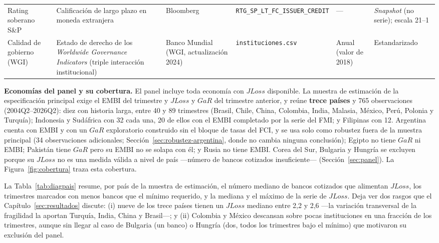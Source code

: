 \begin{footnotesize}
\begin{longtable}{%
  >{\Lc}p{2.15cm}%
  >{\Lc}p{2.7cm}%
  >{\Lc}p{1.8cm}%
  >{\Lc}p{2.85cm}%
  >{\Lc}p{1.75cm}%
  >{\Lc}p{2.5cm}}
Rating soberano S\&P & Calificación de largo plazo en moneda extranjera & Bloomberg & \texttt{RTG\_\allowbreak SP\_\allowbreak LT\_\allowbreak FC\_\allowbreak ISSUER\_\allowbreak CREDIT} & --- & \textit{Snapshot} (no serie); escala 21--1 \\
Calidad de gobierno (WGI) & Estado de derecho de los \textit{Worldwide Governance Indicators} (triple interacción institucional) & Banco Mundial (WGI, actualización 2024) & \texttt{instituciones.\allowbreak csv} & Anual (valor de 2018) & Estandarizado \\

\end{longtable}
\end{footnotesize}

\vspace{1em}

\noindent \textbf{Economías del panel y su cobertura.} El panel incluye toda economía
con $JLoss$ disponible. La muestra de estimación de la especificación principal exige el EMBI
del trimestre y $JLoss$ y $GaR$ del trimestre anterior, y reúne \textbf{trece países} y 765
observaciones (2004Q2--2026Q2): diez con historia larga, entre 40 y 89 trimestres (Brasil,
Chile, China, Colombia, India, Malasia, México, Perú, Polonia y Turquía); Indonesia y
Sudáfrica con 32 cada una, 20 de ellos con el EMBI completado por la serie del FMI; y Filipinas
con 12. Argentina cuenta con EMBI y con un $GaR$ exploratorio construido sin el bloque de tasas
del FCI, y se usa solo como robustez fuera de la muestra principal (34 observaciones
adicionales; Sección~\ref{sec:robustez-argentina}, donde no cambia ninguna conclusión); Egipto no tiene $GaR$ ni
EMBI; Pakistán tiene $GaR$ pero su EMBI no se solapa con él; y Rusia no tiene EMBI. Corea del
Sur, Bulgaria y Hungría se excluyen porque su $JLoss$ no es una medida válida a nivel de país
---número de bancos cotizados insuficiente--- (Sección~\ref{sec:panel}). La Figura~\ref{fig:cobertura} traza esta cobertura.

\vspace{1ex}

\noindent La Tabla~\ref{tab:diagpais} resume, por país de la muestra de estimación, el número
mediano de bancos cotizados que alimentan $JLoss$, los trimestres marcados con menos bancos
que el mínimo requerido, y la mediana y el máximo de la serie de $JLoss$. Deja ver dos rasgos
que el Capítulo~\ref{sec:resultados} discute: (i) nueve de los trece países tienen un $JLoss$
mediano entre 2,2 y 2,6 —la variación transversal de la fragilidad la aportan Turquía, India,
China y Brasil—; y (ii) Colombia y México descansan sobre pocas instituciones en una fracción
de los trimestres, aunque sin llegar al caso de Bulgaria (un banco) o Hungría (dos, todos los
trimestres bajo el mínimo) que motivaron su exclusión del panel.

